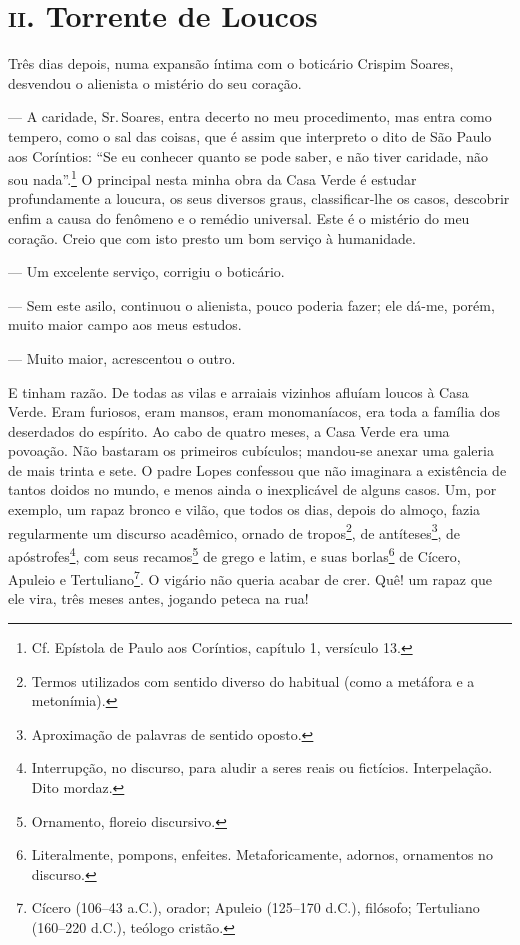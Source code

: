 \section*{\textsc{ii}. Torrente de Loucos}

Três dias depois, numa expansão íntima com o boticário Crispim Soares,
desvendou o alienista o mistério do seu coração.

--- A caridade, Sr.\,Soares, entra decerto no meu procedimento, mas entra
como tempero, como o sal das coisas, que é assim que interpreto o dito
de São Paulo aos Coríntios: ``Se eu conhecer quanto se pode saber, e não
tiver caridade, não sou nada''.\footnote{Cf. Epístola de Paulo aos
  Coríntios, capítulo 1, versículo 13.} O principal nesta minha obra da
Casa Verde é estudar profundamente a loucura, os seus diversos graus,
classificar-lhe os casos, descobrir enfim a causa do fenômeno e o
remédio universal. Este é o mistério do meu coração. Creio que com isto
presto um bom serviço à humanidade.

--- Um excelente serviço, corrigiu o boticário.

--- Sem este asilo, continuou o alienista, pouco poderia fazer; ele
dá-me, porém, muito maior campo aos meus estudos.

--- Muito maior, acrescentou o outro.

E tinham razão. De todas as vilas e arraiais vizinhos afluíam loucos à
Casa Verde. Eram furiosos, eram mansos, eram monomaníacos, era toda a
família dos deserdados do espírito. Ao cabo de quatro meses, a Casa
Verde era uma povoação. Não bastaram os primeiros cubículos; mandou-se
anexar uma galeria de mais trinta e sete. O padre Lopes confessou que
não imaginara a existência de tantos doidos no mundo, e menos ainda o
inexplicável de alguns casos. Um, por exemplo, um rapaz bronco e vilão,
que todos os dias, depois do almoço, fazia regularmente um discurso
acadêmico, ornado de tropos\footnote{Termos utilizados com sentido
  diverso do habitual (como a metáfora e a metonímia).}, de
antíteses\footnote{Aproximação de palavras de sentido oposto.}, de
apóstrofes\footnote{Interrupção, no discurso, para aludir a seres reais
  ou fictícios. Interpelação. Dito mordaz.}, com seus recamos\footnote{Ornamento,
  floreio discursivo.} de grego e latim, e suas borlas\footnote{Literalmente,
  pompons, enfeites. Metaforicamente, adornos, ornamentos no discurso.}
de Cícero, Apuleio e Tertuliano\footnote{Cícero (106--43 a.C.), orador;
  Apuleio (125--170 d.C.), filósofo; Tertuliano (160--220 d.C.), teólogo
  cristão.}. O vigário não queria acabar de crer. Quê! um rapaz que ele
vira, três meses antes, jogando peteca na rua!

